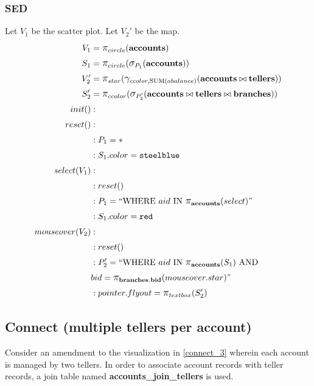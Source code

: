 \subsubsection{SED}
Let $V_1$ be the scatter plot.
Let $V_2'$ be the map.
\begin{align*}
	V_1&= \mathlarger{\pi}_{circle}(\bf{accounts})\\
	S_1&= \mathlarger{\pi}_{circle}(\mathlarger{\sigma}_{P_1}(\bf{accounts}))\\
	V_2'&= \mathlarger{\pi}_{star}(\mathlarger{\gamma}_{ccolor, \text{SUM}(abalance)}(\bf{accounts}\bowtie{}\bf{tellers}))\\
	S_2'&= \mathlarger{\pi}_{ccolor}(\mathlarger{\sigma}_{P_2'}(\bf{accounts}\bowtie{}\bf{tellers}\bowtie{}\bf{branches}))\\
	init()&:\\
	reset()&:\\
	&: P_1 = *\\
	&: S_1.color = \texttt{steelblue}\\
	select(V_1)&:\\
	&: reset()\\
	&: P_1 = ``\text{WHERE}~aid~\text{IN}~\mathlarger{\pi}_{\bf{accounts}}(select)"\\
	&: S_1.color = \texttt{red}\\
	mouseover(V_2)&:\\
	&: reset()\\
	&: P_2' = ``\text{WHERE}~aid~\text{IN}~\mathlarger{\pi}_{\bf{accounts}}(S_1)~\text{AND}\\&bid=\mathlarger{\pi}_{\bf{branches.bid}}(mouseover.star)"\\
	&: pointer.flyout = \mathlarger{\pi}_{textbox}(S_2')\\
\end{align*}
\subsection{Connect (multiple tellers per account)}
Consider an amendment to the visualization in \autoref{connect_3} wherein each account is managed by two tellers.
In order to associate account records with teller records, a join table named \textbf{accounts\_join\_tellers} is used.
